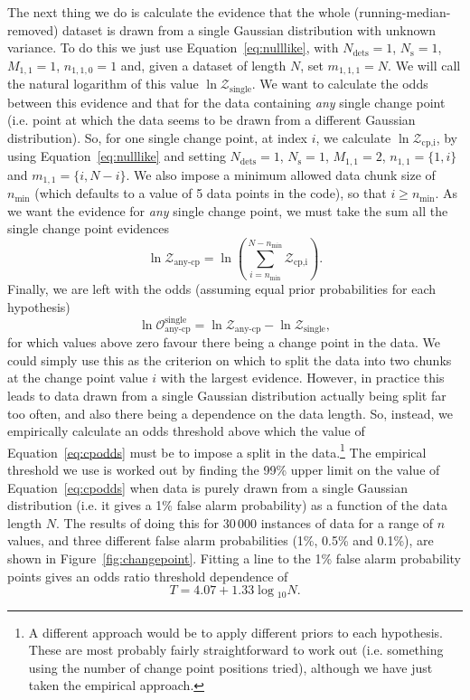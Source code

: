 The next thing we do is calculate the evidence that the whole (running-median-removed) dataset is drawn from a single
Gaussian distribution with unknown variance. To do this we just use Equation~\ref{eq:nulllike}, with $N_{\text{dets}} =1$,
$N_{\text{s}}=1$, $M_{1,1}=1$, $n_{1,1,0}=1$ and, given a dataset of length $N$, set $m_{1,1,1}=N$. We will call the natural logarithm
of this value $\ln{\mathcal{Z}_{\text{single}}}$. We want to calculate the odds between this evidence and that for the data containing
{\it any} single change point (i.e. point at which the data seems to be drawn from a different Gaussian distribution). So, for
one single change point, at index $i$, we calculate $\ln{\mathcal{Z}_{\text{cp,i}}}$, by using Equation~\ref{eq:nulllike} and setting
$N_{\text{dets}} =1$, $N_{\text{s}}=1$, $M_{1,1}=2$, $n_{1,1}=\{1,i\}$ and $m_{1,1} = \{i,N-i\}$. We also impose a minimum allowed data
chunk size of $n_{\text{min}}$ (which defaults to a value of 5 data points in the code), so that $i \geqslant n_{\text{min}}$. As we want
the evidence for {\it any} single change point, we must take the sum all the single change point evidences
\begin{equation}
 \ln{\mathcal{Z}_{\text{any-cp}}} = \ln{\left(\sum_{i=n_{\text{min}}}^{N-n_{\text{min}}} \mathcal{Z}_{\text{cp,i}} \right)}.
\end{equation}
Finally, we are left with the odds (assuming equal prior probabilities for each hypothesis)
\begin{equation}\label{eq:cpodds}
 \ln{\mathcal{O}_{\text{any-cp}}^{\text{single}}} = \ln{\mathcal{Z}_{\text{any-cp}}} - \ln{\mathcal{Z}_{\text{single}}},
\end{equation}
for which values above zero favour there being a change point in the data. We could simply use this as the criterion on which to
split the data into two chunks at the change point value $i$ with the largest evidence. However, in practice this leads to
data drawn from a single Gaussian distribution actually being split far too often, and also there being a dependence on the
data length. So, instead, we empirically calculate an odds threshold above which the value of Equation~\ref{eq:cpodds} must be to
impose a split in the data.\footnote{A different approach would be to apply different priors to each hypothesis. These are most
probably fairly straightforward to work out (i.e. something using the number of change point positions tried), although we have just taken
the empirical approach.} The empirical threshold we use is worked out by finding the 99\% upper limit on the value of
Equation~\ref{eq:cpodds} when data is purely drawn from a single Gaussian distribution (i.e. it gives a 1\% false alarm probability)
as a function of the data length $N$. The results of doing this for 30\,000 instances of data for a range of $n$ values, and three
different false alarm probabilities (1\%, 0.5\% and 0.1\%), are shown in Figure~\ref{fig:changepoint}. Fitting a line to the 1\% false alarm
probability points gives an odds ratio threshold dependence of
\begin{equation}
 T = 4.07 + 1.33\log{}_{10}{N}.
\end{equation}

